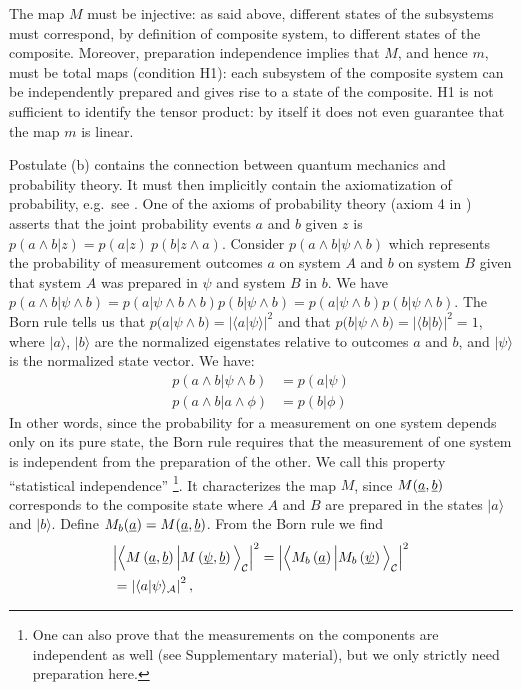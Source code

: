 \documentclass[aps,prl,amsmath,amssymb,twocolumn]{revtex4}
\theoremstyle{plain}
\theoremstyle{definition}
\theoremstyle{remark}
\newcommand{\pj}[1] {\underbar{$#1$}}
\def\>{\rangle}
\def\<{\langle}
\def\labell#1{\label{#1}}
\begin{document}
The map $M$ must be injective: as said above, different states of the
subsystems must correspond, by definition of composite system, to
different states of the composite. Moreover, preparation independence
implies that $M$, and hence $m$, must be total maps (condition H1):
each subsystem of the composite system can be independently prepared
and gives rise to a state of the composite.  H1 is not sufficient to
identify the tensor product: by itself it does not even guarantee that
the map $m$ is linear.
	
Postulate (b) contains the connection between quantum mechanics and
probability theory. It must then implicitly contain the axiomatization
of probability, e.g.~see \cite{ballentinepaper,ballentinebook,cox}.
One of the axioms of probability theory (axiom 4 in
\cite{ballentinepaper}) asserts that the joint probability events $a$
and $b$ given $z$ is $p(a\wedge b|z)=p(a|z)\:p(b|z\wedge a)$.
Consider $p(a \wedge b | \psi \wedge b)$ which represents the
probability of measurement outcomes $a$ on system $A$ and $b$ on
system $B$ given that system $A$ was prepared in $\psi$ and system $B$
in $b$.  We have
$p(a \wedge b | \psi \wedge b) = p(a | \psi \wedge b \wedge b) p(b |
\psi \wedge b) = p(a | \psi \wedge b ) p(b | \psi \wedge b)$. The Born
rule tells us that $p(a | \psi \wedge b) = |\<a|\psi\>|^2$ and that
$p(b | \psi \wedge b) = |\<b|b\>|^2 = 1$, where $|a\>$, $|b\>$ are the
normalized eigenstates relative to outcomes $a$ and $b$, and $|\psi\>$
is the normalized state vector. We have:
\begin{align}
  p(a\wedge b|\psi \wedge b)&=p(a|\psi)\\
  p(a\wedge b|a \wedge \phi)&=p(b|\phi)
\end{align}
In other words, since the probability for a measurement on one system
depends only on its pure state, the Born rule requires that the
measurement of one system is independent from the preparation of the
other. We call this property ``statistical
independence'' \footnote{One can also prove that the measurements on
  the components are independent as well (see Supplementary material),
  but we only strictly need preparation here.}.  It characterizes the
map $M$, since $M(\pj{a}, \pj{b})$ corresponds to the composite state
where $A$ and $B$ are prepared in the states $|a\>$ and $|b\>$.
Define $M_b(\pj{a}) = M(\pj{a},\pj{b})$. From the Born rule we find
\begin{align} &\Big|\Big\<M\left(\pj{a},\pj{b}\right)\Big|M\left(\pj{\psi},\pj{b}\right)\Big\>_{\cal C}\Big|^2
	=\Big|\Big\<M_b\left(\pj{a}\right)\Big|M_b\left(\pj{\psi}\right)\Big\>_{\cal C}\Big|^2
	\nonumber \\&
	=\left|\<a|\psi\>_{\cal A}\right|^2
                      \labell{questa},
\end{align}
\end{document}
